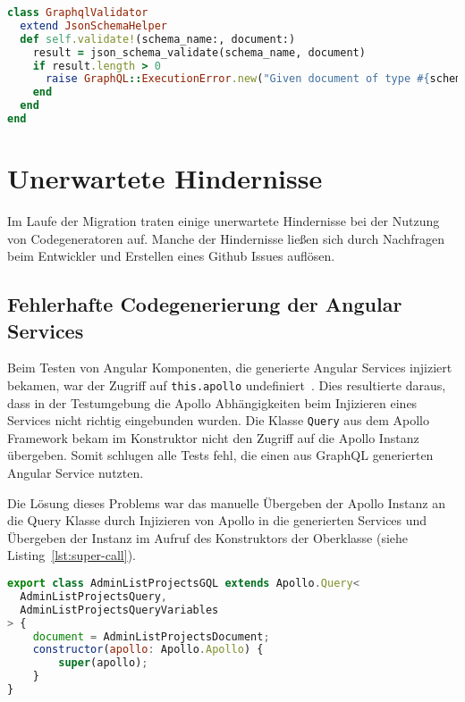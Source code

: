 \begin{lstlisting}[language=Ruby,float=h!,caption={Validator Klasse zum Prüfen, ob der übergebene Parameter die Beschaffenheit des JSON Schema aufweist. \lstinline|/graphql/validators/graphql_validator.rb|}, label={lst:jsonschema-validation}]
class GraphqlValidator
  extend JsonSchemaHelper
  def self.validate!(schema_name:, document:)
    result = json_schema_validate(schema_name, document)
    if result.length > 0
      raise GraphQL::ExecutionError.new("Given document of type #{schema_name} does not match the schema[...]", extensions: { code: 'VALIDATION' })
    end
  end
end
\end{lstlisting}

\section{Unerwartete Hindernisse}
Im Laufe der Migration traten einige unerwartete Hindernisse bei der Nutzung von Codegeneratoren auf. Manche der Hindernisse ließen sich durch Nachfragen beim Entwickler und Erstellen eines Github Issues auflösen.

\subsection{Fehlerhafte Codegenerierung der Angular Services}
Beim Testen von Angular Komponenten, die generierte Angular Services injiziert bekamen, war der Zugriff auf \texttt{this.apollo} undefiniert~\cite{github-apollo-undefined}. Dies resultierte daraus, dass in der Testumgebung die Apollo Abhängigkeiten beim Injizieren eines Services nicht richtig eingebunden wurden. Die Klasse \texttt{Query} aus dem Apollo Framework bekam im Konstruktor nicht den Zugriff auf die Apollo Instanz übergeben. Somit schlugen alle Tests fehl, die einen aus GraphQL generierten Angular Service nutzten.

Die Lösung dieses Problems war das manuelle Übergeben der Apollo Instanz an die Query Klasse durch Injizieren von Apollo in die generierten Services und Übergeben der Instanz im Aufruf des Konstruktors der Oberklasse (siehe Listing~\ref{lst:super-call}).

\begin{lstlisting}[language=JavaScript,float=h!,caption={Injizieren von Apollo in generierten Angular Service und Übergeben der Apollo Instanz an den Konstruktors der Oberklasse}, label={lst:super-call}]
export class AdminListProjectsGQL extends Apollo.Query<
  AdminListProjectsQuery,
  AdminListProjectsQueryVariables
> {
	document = AdminListProjectsDocument;
	constructor(apollo: Apollo.Apollo) {
		super(apollo);
	}
}
\end{lstlisting}

